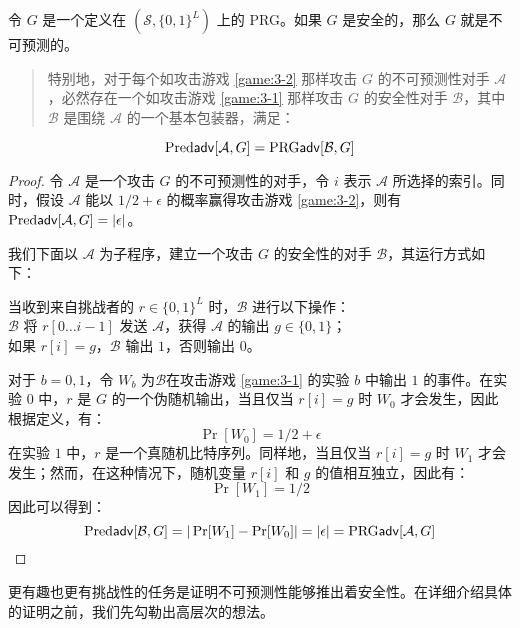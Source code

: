 \begin{theorem}
令 $G$ 是一个定义在 $(\mathcal{S},\{0,1\}^L)$ 上的 PRG。如果 $G$ 是安全的，那么 $G$ 就是不可预测的。
\begin{quote}
特别地，对于每个如攻击游戏 \ref{game:3-2} 那样攻击 $G$ 的不可预测性对手 $\mathcal{A}$，必然存在一个如攻击游戏 \ref{game:3-1} 那样攻击 $G$ 的安全性对手 $\mathcal{B}$，其中 $\mathcal{B}$ 是围绕 $\mathcal{A}$ 的一个基本包装器，满足：
\end{quote}
$$
{\rm Pred\mathsf{adv}}[\mathcal{A},G]={\rm PRG\mathsf{adv}}[\mathcal{B},G]
$$
\end{theorem}

\begin{proof}
令 $\mathcal{A}$ 是一个攻击 $G$ 的不可预测性的对手，令 $i$ 表示 $\mathcal{A}$ 所选择的索引。同时，假设 $\mathcal{A}$ 能以 ${1}/{2}+\epsilon$ 的概率赢得攻击游戏 \ref{game:3-2}，则有${\rm Pred\mathsf{adv}}[\mathcal{A},G]=|\epsilon|$。

我们下面以 $\mathcal{A}$ 为子程序，建立一个攻击 $G$ 的安全性的对手 $\mathcal{B}$，其运行方式如下：

\vspace*{5pt}

\hspace*{5pt} 当收到来自挑战者的 $r\in\{0,1\}^L$ 时，$\mathcal B$ 进行以下操作：\\
\hspace*{50pt} $\mathcal{B}$ 将 $r[0\dots i-1]$ 发送 $\mathcal{A}$，获得 $\mathcal{A}$ 的输出 $g\in\{0,1\}$；\\
\hspace*{50pt} 如果 $r[i]=g$，$\mathcal{B}$ 输出 $1$，否则输出 $0$。

\vspace*{5pt}

对于 $b=0,1$，令 $W_b$ 为$\mathcal{B}$在攻击游戏 \ref{game:3-1} 的实验 $b$ 中输出 $1$ 的事件。在实验 $0$ 中，$r$ 是 $G$ 的一个伪随机输出，当且仅当 $r[i]=g$ 时 $W_0$ 才会发生，因此根据定义，有：
$$
\Pr[W_0]={1}/{2}+\epsilon
$$
在实验 $1$ 中，$r$ 是一个真随机比特序列。同样地，当且仅当 $r[i]=g$ 时 $W_1$ 才会发生；然而，在这种情况下，随机变量 $r[i]$ 和 $g$ 的值相互独立，因此有：
$$
\Pr[W_1]={1}/{2}
$$
因此可以得到：
$$
{\rm Pred\mathsf{adv}}[\mathcal{B},G]=|\Pr[W_1]-\Pr[W_0]|=|\epsilon|={\rm PRG\mathsf{adv}}[\mathcal{A},G]
$$
\end{proof}

更有趣也更有挑战性的任务是证明不可预测性能够推出着安全性。在详细介绍具体的证明之前，我们先勾勒出高层次的想法。

